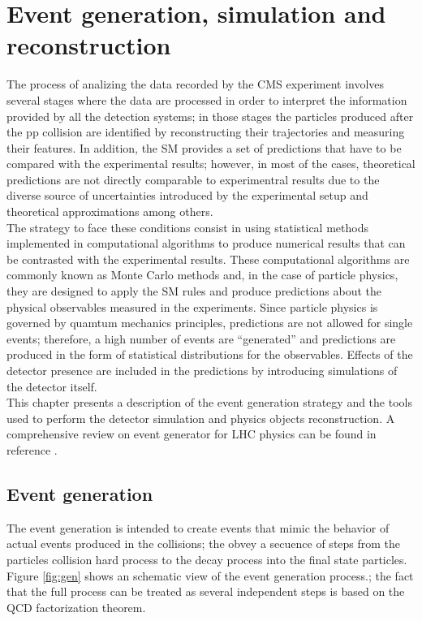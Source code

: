 \chapter{Event generation, simulation and reconstruction}\label{ch:gensimreco}

\noindent The process of analizing the data recorded by the CMS experiment involves several stages where the data are processed in order to interpret the information provided by all the detection systems; in those stages the particles produced after the pp collision are identified by reconstructing their trajectories and measuring their features. In addition, the SM provides a set of predictions that have to be compared with the experimental results; however, in most of the cases, theoretical predictions are not directly comparable to experimentral results due to the diverse source of uncertainties introduced by the experimental setup and theoretical approximations among others.\\

\noindent The strategy to face these conditions consist in using statistical methods implemented in computational algorithms to produce numerical results that can be contrasted with the experimental results. These computational algorithms are commonly known as Monte Carlo methods and, in the case of particle physics, they are designed to apply the SM rules and produce predictions about the physical observables measured in the experiments. Since particle physics is governed by quamtum mechanics principles, predictions are not allowed for single events; therefore, a high number of events are ``generated'' and predictions are produced in the form of statistical distributions for the observables. Effects of the detector presence are included in the predictions by introducing simulations of the detector itself.\\     

\noindent This chapter presents a description of the event generation strategy and the tools used to perform the detector simulation and physics objects reconstruction. A comprehensive review on event generator for LHC physics can be found in reference \cite{gen}.  

\section{Event generation}

\noindent The event generation is intended to create events that mimic the behavior of actual events produced in the collisions; the obvey a secuence of steps from the particles collision hard process to the decay process into the final state particles. Figure \ref{fig:gen} shows an schematic view of the event generation process.; the fact that the full process can be treated as several independent steps is based on the QCD factorization theorem.\\     

